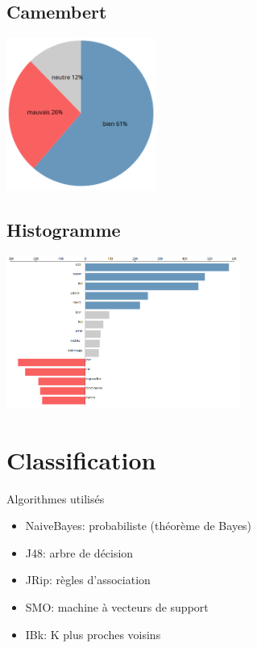 \documentclass{beamer}
\begin{document}
\subsection{Camembert}
\begin{frame}
	\includegraphics[height=5cm]{imgs/visu1.png}
\end{frame}

\subsection{Histogramme}
\begin{frame}
	\includegraphics[height=5cm]{imgs/visu2.png}
\end{frame}

\section{Classification}

\begin{frame}
	\begin{block}{Algorithmes utilisés}
		\begin{itemize}
			\item NaiveBayes: probabiliste (théorème de Bayes)
			\item J48: arbre de décision
			\item JRip: règles d'association
			\item SMO: machine à vecteurs de support
			\item IBk: K plus proches voisins
		\end{itemize}
	\end{block}
\end{frame}
\end{document}
